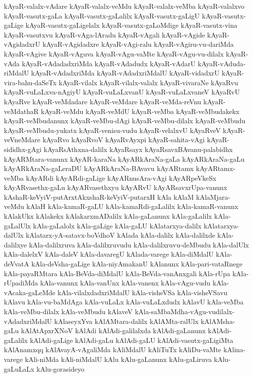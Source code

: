{kAyaR-valalx-vAdare
kAyaR-valalx-veMdu
kAyaR-valalx-veMba
kAyaR-valalxvo
kAyaR-vasutx-gaLa
kAyaR-vasutx-gaLalilx
kAyaR-vasutx-gaLigU
kAyaR-vasutx-gaLige
kAyaR-vasutx-gaLigelalx
kAyaR-vasutx-gaLoMdige
kAyaR-vasutx-vina
kAyaR-vasutxvu
kAyaR-vAga-lAradu
kAyaR-vAgali
kAyaR-vAgide
kAyaR-vAgidadxrU
kAyaR-vAgidadxre
kAyaR-vAgi-ralu
kAyaR-vAgiru-vu-dariMda
kAyaR-vAgive
kAyaR-vAguva
kAyaR-vAgu-vaMte
kAyaR-vAgu-vu-dilalx
kAyaR-vAda
kAyaR-vAdadadxriMda
kAyaR-vAdadudx
kAyaR-vAdarU
kAyaR-vAduda-riMdalU
kAyaR-vAdadxriMda
kAyaR-vAdadxriMdalU
kAyaR-vidadxrU
kAyaR-vira-bahu-daSeTx
kAyaR-vilalx
kAyaR-vilalx-valalx
kAyaR-vivaraNe
kAyaRvu
kAyaR-vuLaLxva-nAgiyU
kAyaR-vuLaLxvanU
kAyaR-vuLaLxvaneV
kAyaRvU
kAyaRve
kAyaR-veMdadare
kAyaR-veMdare
kAyaR-veMda-reVnu
kAyaR-veMdathaR
kAyaR-veMdu
kAyaR-veMdU
kAyaR-veMba
kAyaR-veMbudakekx
kAyaR-veMbudanunx
kAyaR-veMbu-dAgi
kAyaR-veMbu-dilalx
kAyaR-veMbudu
kAyaR-veMbudu-yukatx
kAyaR-venisu-vudu
kAyaR-velalxvU
kAyaRveV
kAyaR-veVneMdare
kAyaRvo
kAyaRvoV
kAyaRvAyxpi
kAyaR-sahita-vAgi
kAyaR-sididhx-gAgi
kAyaRsAthxna-dalilx
kAyaRsayx
kAyaRsavxBAvanu-palabidhx
kAyARMtara-vanunx
kAyAR-karaNa
kAyARkAraNa-gaLa
kAyARkAraNa-gaLu
kAyARkAraNa-gaLeraDU
kAyARkAraNa-BAvavu
kAyARtamx
kAyARtamx-veMba
kAyARdi
kAyARdi-gaLige
kAyARnusAra-vAgi
kAyARpeVkeSx
kAyARvasethx-gaLu
kAyARvasethxyu
kAyARvU
kAyARsavxrUpa-vanunx
kAshaR-keVyiV-putArxtAkxshaR-keVyiV-putarxH
kAla
kAlaM
kAlaMjara-veMdu
kAlaH
kAla-kamaR-gaLU
kAla-kamaRdi-gaLalilx
kAla-kamaR-vanunx
kAlakUkx
kAlakekx
kAlakarxmADalilx
kAla-gaLanunx
kAla-gaLalilx
kAla-gaLalUlx
kAla-gaLalolx
kAla-gaLige
kAla-gaLU
kAlatarxya-dalilx
kAlatarxya-dalUlx
kAlatarx-yA-satavx-boVdhoV
kAlada
kAla-dalilx
kAla-dalilxde
kAla-dalilxye
kAla-dalilxruva
kAla-dalilxruvudu
kAla-dalilxruvu-deMbudu
kAla-dalUlx
kAla-dalelxV
kAla-daleV
kAla-davaregU
kAlada-varege
kAla-diMdalU
kAla-deVvatA
kAla-deVsha-gaLige
kAla-niyAmakanU
kAlanunx
kAla-pari-vataRnege
kAla-payaRMtara
kAla-BeVda-diMdalU
kAla-BeVda-vanAnxgali
kAla-rUpa
kAla-rUpadiMda
kAla-vanunx
kAla-vanUnx
kAla-vanenx
kAla-vAgu-vudu
kAla-vAcaka-gaLeMde
kAla-vilalxdadxriMdalU
kAla-visheVSa
kAla-visheVSavu
kAlavu
kAla-vu-baMdAga
kAla-vuLaLx
kAla-vuLaLxdudx
kAlavU
kAla-veMba
kAla-veMbu-dilalx
kAla-veMbudu
kAlaveV
kAla-saMbaMdha-vAgu-vudilalx-vAdadxriMdalU
kAlaseyxYva
kAlAMtara-dalilx
kAlAMta-ralUlx
kAlAMsha-gaLu
kAlAtApxrXNoV
kAlAdi
kAlAdi-galilalxda
kAlAdi-gaLanunx
kAlAdi-gaLalilx
kAlAdi-gaLige
kAlAdi-gaLu
kAlAdi-gaLU
kAlAdi-vasutx-gaLigiMta
kAlAnamxqq
kAlAvayA-vAgaliMda
kAliMdalU
kAliTuTx
kAliDu-vaMte
kAlina-varege
kAli-niMda
kAli-niMdalU
kAlu
kAlu-gaLanunx
kAlu-gaLiruva
kAlu-gaLuLaLx
kAlu-gorasideyo
}
